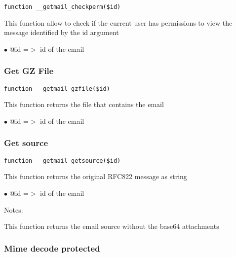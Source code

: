 \documentclass[a4paper]{article}
\begin{document}
\begin{lstlisting}
function __getmail_checkperm($id)
\end{lstlisting}

This function allow to check if the current user has permissions to view the
message identified by the id argument

\begin{compactitem}
\item[\color{myblue}$\bullet$] @id =$>$ id of the email
\end{compactitem}

\hypertarget{toc76}{}
\subsubsection{Get GZ File}

\begin{lstlisting}
function __getmail_gzfile($id)
\end{lstlisting}

This function returns the file that contains the email

\begin{compactitem}
\item[\color{myblue}$\bullet$] @id =$>$ id of the email
\end{compactitem}

\hypertarget{toc77}{}
\subsubsection{Get source}

\begin{lstlisting}
function __getmail_getsource($id)
\end{lstlisting}

This function returns the original RFC822 message as string

\begin{compactitem}
\item[\color{myblue}$\bullet$] @id =$>$ id of the email
\end{compactitem}

Notes:

This function returns the email source without the base64 attachments

\hypertarget{toc78}{}
\subsubsection{Mime decode protected}
\end{document}
